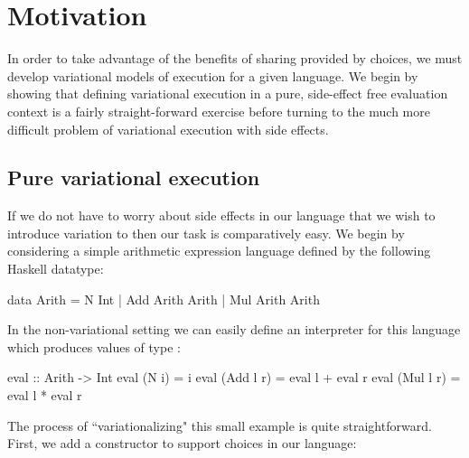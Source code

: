 \documentclass[letterpaper,10pt,onecolumn]{article}
\begin{document}
\begin{center}
\end{center}

\section{Motivation}

In order to take advantage of the benefits of sharing provided by choices, we must develop variational
models of execution for a given language. We begin by showing that defining variational execution in a pure,
side-effect free evaluation context is a fairly straight-forward exercise before turning to the much more
difficult problem of variational execution with side effects.

\subsection{Pure variational execution}

If we do not have to worry about side effects in our language that we wish to introduce variation to then
our task is comparatively easy. We begin by considering a simple arithmetic expression language
defined by the following Haskell datatype:

\begin{program}
data Arith = N Int | Add Arith Arith | Mul Arith Arith
\end{program}

In the non-variational setting we can easily define an interpreter for this language which produces
values of type :

\begin{program}
eval :: Arith -> Int
eval (N i) = i
eval (Add l r) = eval l + eval r
eval (Mul l r) = eval l * eval r
\end{program}

The process of ``variationalizing" this small example is quite straightforward. First, we add a
constructor to support choices in our language:
\end{document}
